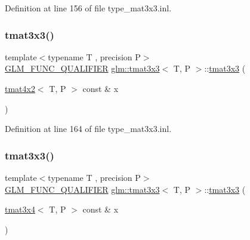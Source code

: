 Definition at line 156 of file type\+\_\+mat3x3.\+inl.

\mbox{\label{structglm_1_1tmat3x3_ae8cd7af88bb36bd318cf96f86bc27725}} 
\subsubsection{\texorpdfstring{tmat3x3()}{tmat3x3()}\hspace{0.1cm}{\footnotesize\ttfamily [16/22]}}
{\footnotesize\ttfamily template$<$typename T , precision P$>$ \\
\mbox{\hyperlink{setup_8hpp_a33fdea6f91c5f834105f7415e2a64407}{G\+L\+M\+\_\+\+F\+U\+N\+C\+\_\+\+Q\+U\+A\+L\+I\+F\+I\+ER}} \mbox{\hyperlink{structglm_1_1tmat3x3}{glm\+::tmat3x3}}$<$ T, P $>$\+::\mbox{\hyperlink{structglm_1_1tmat3x3}{tmat3x3}} (\begin{DoxyParamCaption}\item[{\mbox{\hyperlink{structglm_1_1tmat4x2}{tmat4x2}}$<$ T, P $>$ const \&}]{x }\end{DoxyParamCaption})}



Definition at line 164 of file type\+\_\+mat3x3.\+inl.

\mbox{\label{structglm_1_1tmat3x3_a1498a92906adaa18834058fbea37a808}} 
\subsubsection{\texorpdfstring{tmat3x3()}{tmat3x3()}\hspace{0.1cm}{\footnotesize\ttfamily [17/22]}}
{\footnotesize\ttfamily template$<$typename T , precision P$>$ \\
\mbox{\hyperlink{setup_8hpp_a33fdea6f91c5f834105f7415e2a64407}{G\+L\+M\+\_\+\+F\+U\+N\+C\+\_\+\+Q\+U\+A\+L\+I\+F\+I\+ER}} \mbox{\hyperlink{structglm_1_1tmat3x3}{glm\+::tmat3x3}}$<$ T, P $>$\+::\mbox{\hyperlink{structglm_1_1tmat3x3}{tmat3x3}} (\begin{DoxyParamCaption}\item[{\mbox{\hyperlink{structglm_1_1tmat3x4}{tmat3x4}}$<$ T, P $>$ const \&}]{x }\end{DoxyParamCaption})}



